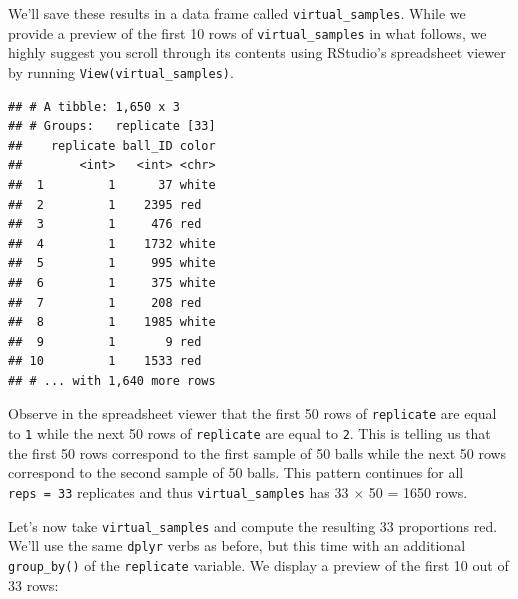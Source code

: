 \documentclass[
]{book}
\newenvironment{Shaded}{\begin{snugshade}}{\end{snugshade}}
\newcommand{\DataTypeTok}[1]{\textcolor[rgb]{0.13,0.29,0.53}{#1}}
\newcommand{\DecValTok}[1]{\textcolor[rgb]{0.00,0.00,0.81}{#1}}
\newcommand{\KeywordTok}[1]{\textcolor[rgb]{0.13,0.29,0.53}{\textbf{#1}}}
\newcommand{\NormalTok}[1]{#1}
\newcommand{\OperatorTok}[1]{\textcolor[rgb]{0.81,0.36,0.00}{\textbf{#1}}}
\newcommand{\StringTok}[1]{\textcolor[rgb]{0.31,0.60,0.02}{#1}}
\begin{document}
We'll save these results in a data frame called \texttt{virtual\_samples}. While we provide a preview of the first 10 rows of \texttt{virtual\_samples} in what follows, we highly suggest you scroll through its contents using RStudio's spreadsheet viewer by running \texttt{View(virtual\_samples)}.

\begin{Shaded}
\end{Shaded}

\begin{verbatim}
## # A tibble: 1,650 x 3
## # Groups:   replicate [33]
##    replicate ball_ID color
##        <int>   <int> <chr>
##  1         1      37 white
##  2         1    2395 red  
##  3         1     476 red  
##  4         1    1732 white
##  5         1     995 white
##  6         1     375 white
##  7         1     208 red  
##  8         1    1985 white
##  9         1       9 red  
## 10         1    1533 red  
## # ... with 1,640 more rows
\end{verbatim}

Observe in the spreadsheet viewer that the first 50 rows of \texttt{replicate} are equal to \texttt{1} while the next 50 rows of \texttt{replicate} are equal to \texttt{2}. This is telling us that the first 50 rows correspond to the first sample of 50 balls while the next 50 rows correspond to the second sample of 50 balls. This pattern continues for all \texttt{reps\ =\ 33} replicates and thus \texttt{virtual\_samples} has 33 \(\times\) 50 = 1650 rows.

Let's now take \texttt{virtual\_samples} and compute the resulting 33 proportions red. We'll use the same \texttt{dplyr} verbs as before, but this time with an additional \texttt{group\_by()} of the \texttt{replicate} variable. We display a preview of the first 10 out of 33 rows:

\begin{Shaded}
\end{Shaded}
\end{document}
